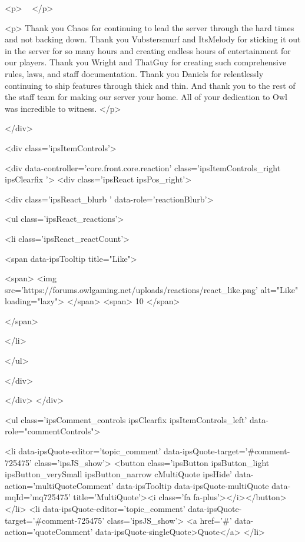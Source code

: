 <p>
	 
</p>

<p>
	Thank you Chaos for continuing to lead the server through the hard times and not backing down. Thank you Vubstersmurf and ItsMelody for sticking it out in the server for so many hours and creating endless hours of entertainment for our players. Thank you Wright and ThatGuy for creating such comprehensive rules, laws, and staff documentation. Thank you Daniels for relentlessly continuing to ship features through thick and thin. And thank you to the rest of the staff team for making our server your home. All of your dedication to Owl was incredible to witness.
</p>


			
		</div>

		
			<div class='ipsItemControls'>
				
					
						

	<div data-controller='core.front.core.reaction' class='ipsItemControls_right ipsClearfix '>	
		<div class='ipsReact ipsPos_right'>
			
				
				<div class='ipsReact_blurb ' data-role='reactionBlurb'>
					
						

	
	<ul class='ipsReact_reactions'>
		
		
			
				
				<li class='ipsReact_reactCount'>
					
						<span data-ipsTooltip title="Like">
					
							<span>
								<img src='https://forums.owlgaming.net/uploads/reactions/react_like.png' alt="Like" loading="lazy">
							</span>
							<span>
								10
							</span>
					
						</span>
					
				</li>
			
		
	</ul>

					
				</div>
			
			
			
		</div>
	</div>

					
				
				<ul class='ipsComment_controls ipsClearfix ipsItemControls_left' data-role="commentControls">
					
						
							<li data-ipsQuote-editor='topic_comment' data-ipsQuote-target='#comment-725475' class='ipsJS_show'>
								<button class='ipsButton ipsButton_light ipsButton_verySmall ipsButton_narrow cMultiQuote ipsHide' data-action='multiQuoteComment' data-ipsTooltip data-ipsQuote-multiQuote data-mqId='mq725475' title='MultiQuote'><i class='fa fa-plus'></i></button>
							</li>
							<li data-ipsQuote-editor='topic_comment' data-ipsQuote-target='#comment-725475' class='ipsJS_show'>
								<a href='#' data-action='quoteComment' data-ipsQuote-singleQuote>Quote</a>
							</li>
						
